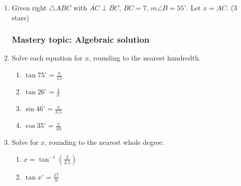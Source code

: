 \documentclass[12pt, twoside]{article}
\begin{document}
\begin{enumerate}
  \item Given right $\triangle ABC$ with $\overline{AC} \perp \overline{BC}$, $BC=7$, $m\angle B=55^\circ$. Let $x=AC$. \hfill (3 stars)
  \begin{flushright}
  \end{flushright}

\newpage
\subsubsection*{Mastery topic: Algebraic solution}
\item Solve each equation for $x$, rounding to the nearest hundredth.
  \begin{multicols}{2}
  \begin{enumerate}
  \item $\displaystyle \tan 75^\circ = \frac{x}{15}$ \vspace{5cm}
  \item $\displaystyle \tan 26^\circ = \frac{4}{x}$
  \item $\displaystyle \sin 46^\circ  = \frac{x}{3.5}$ \vspace{5cm}
  \item $\displaystyle \cos 35^\circ = \frac{x}{10}$
  \end{enumerate}
  \end{multicols}
  \vspace{6cm}

\item Solve for $x$, rounding to the nearest whole degree.
  \begin{multicols}{2}
  \begin{enumerate}
  \item $\displaystyle x = \tan^{-1} (\frac{2}{3.5})$ \vspace{4cm}
  \item $\displaystyle \tan x^\circ = \frac{17}{9}$ \vspace{4cm}
  \end{enumerate}
  \end{multicols}

\end{enumerate}
\end{document}
